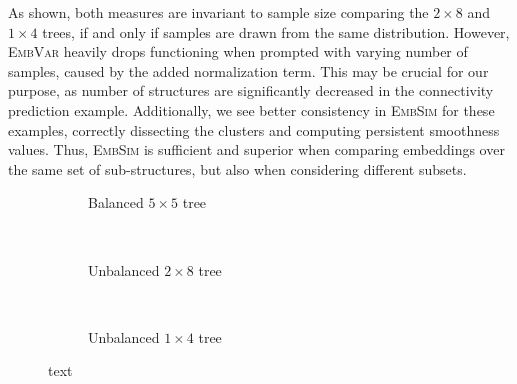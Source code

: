 \documentclass[]{article}
\begin{document}
As shown, both measures are invariant to sample size comparing the $2\times 8$ and $1\times 4$ trees, if and only if samples are drawn from the same distribution. However, \textsc{EmbVar} heavily drops functioning when prompted with varying number of samples, caused by the added normalization term. This may be crucial for our purpose, as number of structures are significantly decreased in the connectivity prediction example. Additionally, we see better consistency in \textsc{EmbSim} for these examples, correctly dissecting the clusters and computing persistent smoothness values. Thus, \textsc{EmbSim} is sufficient and superior when comparing embeddings over the same set of sub-structures, but also when considering different subsets.\\

\begin{figure}
	\centering
	\begin{subfigure}{1.\textwidth}
		\centering
		\caption{Balanced $5\times 5$ tree}
		\label{fig:tree_balanced}
	\end{subfigure}\\
	
	\begin{subfigure}{1.\textwidth}
		\centering
		\label{fig:tree_unbalanced}
		\caption{Unbalanced $2\times 8$ tree}
	\end{subfigure}	\\
	\begin{subfigure}{1.\textwidth}
		\centering
		\label{fig:tree_unbalanced_reduced}
		\caption{Unbalanced $1\times 4$ tree}
	\end{subfigure}	

	\caption{text}
	\label{fig:trees}
\end{figure}
\end{document}
